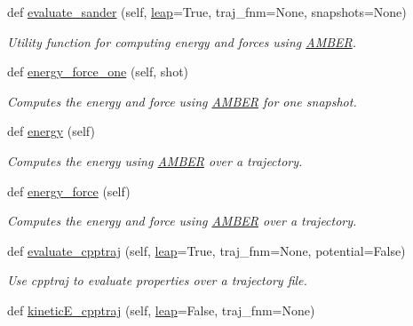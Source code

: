 \begin{DoxyCompactItemize}
\item 
def \hyperlink{classsrc_1_1amberio_1_1AMBER_aaa5d9969b50621ec9288caf56d45c3d2}{evaluate\+\_\+sander} (self, \hyperlink{classsrc_1_1amberio_1_1AMBER_a8cb2d1848fd4fa90dd2998e38592a21e}{leap}=True, traj\+\_\+fnm=None, snapshots=None)
\begin{DoxyCompactList}\small\item\em Utility function for computing energy and forces using \hyperlink{classsrc_1_1amberio_1_1AMBER}{A\+M\+B\+ER}. \end{DoxyCompactList}\item 
def \hyperlink{classsrc_1_1amberio_1_1AMBER_a6b67c489b262f485c3c71664ae241759}{energy\+\_\+force\+\_\+one} (self, shot)
\begin{DoxyCompactList}\small\item\em Computes the energy and force using \hyperlink{classsrc_1_1amberio_1_1AMBER}{A\+M\+B\+ER} for one snapshot. \end{DoxyCompactList}\item 
def \hyperlink{classsrc_1_1amberio_1_1AMBER_a7d4ea449a1f78e9795b323547734a217}{energy} (self)
\begin{DoxyCompactList}\small\item\em Computes the energy using \hyperlink{classsrc_1_1amberio_1_1AMBER}{A\+M\+B\+ER} over a trajectory. \end{DoxyCompactList}\item 
def \hyperlink{classsrc_1_1amberio_1_1AMBER_ab2237300f0b314b61e034c1d43504d2c}{energy\+\_\+force} (self)
\begin{DoxyCompactList}\small\item\em Computes the energy and force using \hyperlink{classsrc_1_1amberio_1_1AMBER}{A\+M\+B\+ER} over a trajectory. \end{DoxyCompactList}\item 
def \hyperlink{classsrc_1_1amberio_1_1AMBER_aebf6805d55d195578926031a77282daf}{evaluate\+\_\+cpptraj} (self, \hyperlink{classsrc_1_1amberio_1_1AMBER_a8cb2d1848fd4fa90dd2998e38592a21e}{leap}=True, traj\+\_\+fnm=None, potential=False)
\begin{DoxyCompactList}\small\item\em Use cpptraj to evaluate properties over a trajectory file. \end{DoxyCompactList}\item 
def \hyperlink{classsrc_1_1amberio_1_1AMBER_ad7c82d0258dc29e9326b0ee188097fca}{kinetic\+E\+\_\+cpptraj} (self, \hyperlink{classsrc_1_1amberio_1_1AMBER_a8cb2d1848fd4fa90dd2998e38592a21e}{leap}=False, traj\+\_\+fnm=None)

\end{DoxyCompactItemize}
